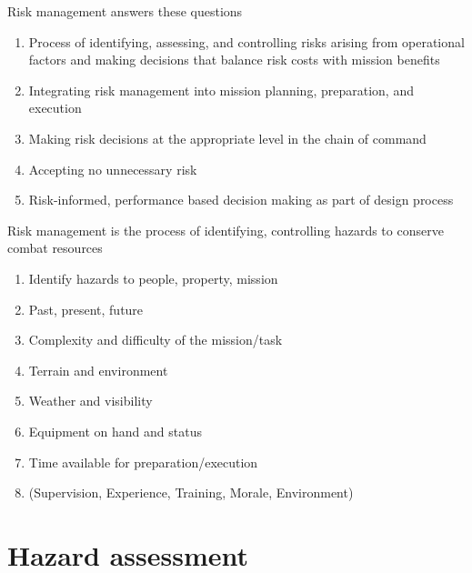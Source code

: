 \documentclass[aspectratio=1610,pdftex,dvipsnames,compress,xcolor={dvipsnames}]{beamer}
\begin{document}
\begin{frame}{Risk management answers these questions}
    \begin{enumerate}[series=outerlist,topsep=0pt,itemsep=21pt,leftmargin=*,label=(\arabic*)]
        \item[]Process of identifying, assessing, and controlling risks arising from operational factors and making decisions that balance risk costs with mission benefits 
        \item[]Integrating risk management into mission planning, preparation, and execution
        \item[]Making risk decisions at the appropriate level in the chain of command
        \item[]Accepting no unnecessary risk
        \item[]Risk-informed, performance based decision making as part of design process
    \end{enumerate}
\end{frame}


\begin{frame}{Risk management is the process of identifying, controlling hazards to conserve combat resources}
    \begin{enumerate}[series=outerlist,topsep=0pt,itemsep=11pt,leftmargin=*,label=(\arabic*)]
        \item[]Identify hazards to people, property, mission  
        \item[]Past, present, future  
        \item[]Complexity and difficulty of the mission/task  
        \item[]Terrain and environment  
        \item[]Weather and visibility  
        \item[]Equipment on hand and status 
        \item[]Time available for preparation/execution  
        \item[](Supervision, Experience, Training, Morale, Environment)
    \end{enumerate}
\end{frame}


\section{Hazard assessment}
\end{document}
